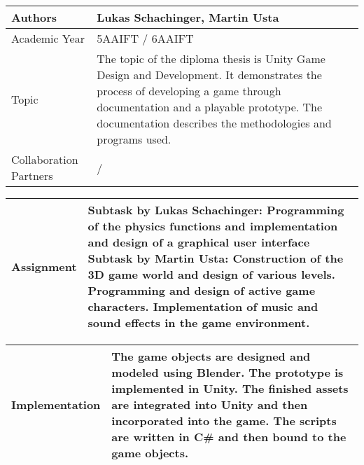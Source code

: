 
\noindent
\begin{tabular}{|m{}|m{}|}
\hline
Authors & Lukas Schachinger, Martin Usta \\
\hline
Academic Year & 5AAIFT / 6AAIFT \\
\hline
Topic & The topic of the diploma thesis is Unity Game Design and Development. It demonstrates the process of developing a game through documentation and a playable prototype. The documentation describes the methodologies and programs used. \\
\hline
Collaboration Partners & / \\
\hline
\end{tabular}

\vspace{10pt}

\noindent
\begin{tabular}{|m{}|m{}|}
\hline
Assignment & Subtask by Lukas Schachinger: \newline \newline Programming of the physics functions and implementation and design of a graphical user interface \newline \newline Subtask by Martin Usta: \newline \newline Construction of the 3D game world and design of various levels. Programming and design of active game characters. Implementation of music and sound effects in the game environment.\\
\hline
\end{tabular}

\pagebreak

\noindent
\begin{tabular}{|m{}|m{}|}
\hline
Implementation & The game objects are designed and modeled using Blender. \newline \newline The prototype is implemented in Unity. The finished assets are integrated into Unity and then incorporated into the game. \newline \newline The scripts are written in C\# and then bound to the game objects. \\
\hline
\end{tabular}

